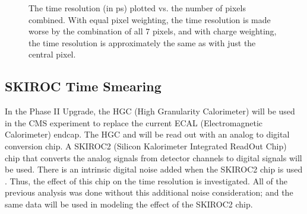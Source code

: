 \documentclass[twocolumn,aps,prd,reprint]{revtex4-1}
\begin{document}
\begin{figure}[!htbp]
\centering
{} 
\caption{The time resolution (in ps) plotted vs. the number of pixels combined. With equal pixel weighting, the time resolution is made worse by the combination of all 7 pixels, and with charge weighting, the time resolution is approximately the same as with just the central pixel.}
\label{resolution charge equal}
\end{figure}

\subsection{SKIROC Time Smearing}

In the Phase II Upgrade, the HGC (High Granularity Calorimeter) will be used in the CMS experiment to replace the current ECAL (Electromagnetic Calorimeter) endcap. The HGC and will be read out with an analog to digital conversion chip. A SKIROC2 (Silicon Kalorimeter Integrated ReadOut Chip) chip that converts the analog signals from detector channels to digital signals will be used. There is an intrinsic digital noise added when the SKIROC2 chip is used  \cite{Callier}. Thus, the effect of this chip on the time resolution is investigated. All of the previous analysis was done without this additional noise consideration; and the same data will be used in modeling the effect of the SKIROC2 chip.
\end{document}
